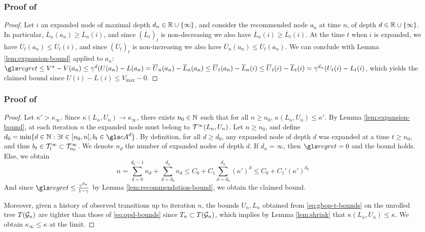 \begin{subappendices}
\subsubsection{Proof of }
\begin{proof}
	Let $i$ an expanded node of maximal depth $d_n\in\mathbb{R}\cup\{\infty\}$, and consider the recommended node $a_n$ at time $n$, of depth $d\in\mathbb{R}\cup\{\infty\}$. In particular, $\overline{L}_n(a_n) \geq \overline{L}_n(i)$, and since $(\overline{L}_t)_t$ is non-decreasing we also have $\overline{L}_n(i) \geq \overline{L}_t(i)$. At the time $t$ when $i$ is expanded, we have $\overline{U}_t(a_n) \leq \overline{U}_t(i)$, and since $(\overline{U}_t)_t$ is non-increasing we also have $\overline{U}_n(a_n) \leq \overline{U}_t(a_n)$. We can conclude with Lemma \ref{lem:expansion-bound} applied to $a_n$: $\regret \leq V^\star - V(a_n) \leq  \gamma^d(U(a_n)-L(a_n) = \overline{U}_n(a_n) - \overline{L}_n(a_n)  \leq \overline{U}_t(a_n) - \overline{L}_n(i) \leq \overline{U}_t(i) - \overline{L}_t(i) = \gamma^{d_n}(U_t(i) - L_t(i)$, which yields the claimed bound since $U(i) - L(i) \leq V_{\max}-0$.
\end{proof}


\subsubsection{Proof of }

\begin{proof}
Let $\kappa'>\kappa_\infty$. Since $\kappa(L_n,U_n)\rightarrow\kappa_\infty$, there exists $n_0\in\mathbb{N}$ such that for all $n\geq n_0$, $\kappa(L_n,U_n) \leq \kappa'$.
By Lemma \ref{lem:expansion-bound}, at each iteration $n$ the expanded node must belong to $\mathcal{T}^\infty(L_n,U_n)$.
Let $n\geq n_0$, and define $d_0 = \min\{d\in\Natural: \exists t \in[n_0,n], b_t\in \cA^d \}$. By definition, for all $d\geq d_0$, any expanded node of depth $d$ was expanded at a time $t\geq n_0$, and thus $b_t\in\mathcal{T}^\infty_t \subset\mathcal{T}^\infty_{n_0}$. We denote $n_d$ the number of expanded nodes of depth $d$. If $d_n=\infty$, then $\regret = 0$ and the bound holds. Else, we obtain
\[
n = \sum_{d=0}^{d_0-1}n_d + \sum_{d=d_0}^{d_n} n_d \leq  C_0 + C_1\sum_{d=d_0}^{d_n} (\kappa')^d \leq C_0 + C_1' (\kappa')^{d_n}
\]
And since $\regret \leq \frac{\gamma^{d_n}}{1-\gamma}$ by Lemma \ref{lem:recommendation-bound}, we obtain the claimed bound.

Moreover, given a history of observed transitions up to iteration $n$, the bounds $U_n, L_n$ obtained from \eqref{eq:gbop-t-bounds} on the unrolled tree $T(\mathcal{G}_n)$ are tighter than those of \eqref{eq:opd-bounds} since $T_n\subset T(\mathcal{G}_n)$, which implies by Lemma \ref{lem:shrink} that $\kappa(L_n, U_n) \leq \kappa$. We obtain $\kappa_\infty \leq \kappa$ at the limit. 
\end{proof}


\end{subappendices}
